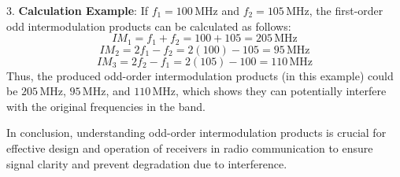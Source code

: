 3. \textbf{Calculation Example}: If \( f_1 = 100 \, \text{MHz} \) and \( f_2 = 105 \, \text{MHz} \), the first-order odd intermodulation products can be calculated as follows:
   \[
   IM_{1} = f_1 + f_2 = 100 + 105 = 205 \, \text{MHz}
   \]
   \[
   IM_{2} = 2f_1 - f_2 = 2(100) - 105 = 95 \, \text{MHz}
   \]
   \[
   IM_{3} = 2f_2 - f_1 = 2(105) - 100 = 110 \, \text{MHz}
   \]
   Thus, the produced odd-order intermodulation products (in this example) could be \( 205 \, \text{MHz} \), \( 95 \, \text{MHz} \), and \( 110 \, \text{MHz} \), which shows they can potentially interfere with the original frequencies in the band.



In conclusion, understanding odd-order intermodulation products is crucial for effective design and operation of receivers in radio communication to ensure signal clarity and prevent degradation due to interference.
